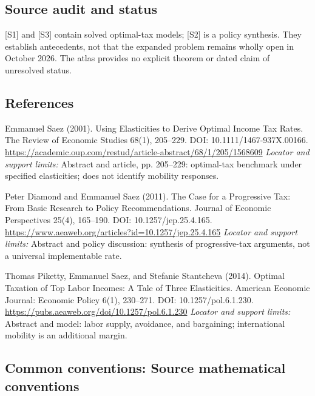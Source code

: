 \documentclass[11pt,a4paper]{article}
\begin{document}
\subsection*{Source audit and status}
[S1] and [S3] contain solved optimal-tax models; [S2] is a policy synthesis. They establish antecedents, not that the expanded problem remains wholly open in October 2026. The atlas provides no explicit theorem or dated claim of unresolved status.

\subsection*{References}
\begin{enumerate}[label={[S\arabic*]},leftmargin=*,itemsep=0.6em]
\item Emmanuel Saez (2001). Using Elasticities to Derive Optimal Income Tax Rates. The Review of Economic Studies 68(1), 205--229. DOI: 10.1111/1467-937X.00166.
\url{https://academic.oup.com/restud/article-abstract/68/1/205/1568609}
\newline\emph{Locator and support limits:} Abstract and article, pp. 205--229: optimal-tax benchmark under specified elasticities; does not identify mobility responses.
\item Peter Diamond and Emmanuel Saez (2011). The Case for a Progressive Tax: From Basic Research to Policy Recommendations. Journal of Economic Perspectives 25(4), 165--190. DOI: 10.1257/jep.25.4.165.
\url{https://www.aeaweb.org/articles?id=10.1257/jep.25.4.165}
\newline\emph{Locator and support limits:} Abstract and policy discussion: synthesis of progressive-tax arguments, not a universal implementable rate.
\item Thomas Piketty, Emmanuel Saez, and Stefanie Stantcheva (2014). Optimal Taxation of Top Labor Incomes: A Tale of Three Elasticities. American Economic Journal: Economic Policy 6(1), 230--271. DOI: 10.1257/pol.6.1.230.
\url{https://pubs.aeaweb.org/doi/10.1257/pol.6.1.230}
\newline\emph{Locator and support limits:} Abstract and model: labor supply, avoidance, and bargaining; international mobility is an additional margin.
\end{enumerate}

\subsection*{Common conventions: Source mathematical conventions}
\end{document}
